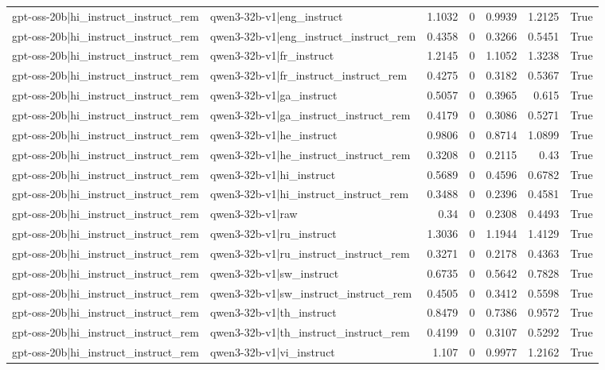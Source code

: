 \begin{table}
\begin{tabular}{l l r r r r l}
gpt-oss-20b|hi_instruct_instruct_rem & qwen3-32b-v1|eng_instruct & 1.1032 & 0 & 0.9939 & 1.2125 & True \\
gpt-oss-20b|hi_instruct_instruct_rem & qwen3-32b-v1|eng_instruct_instruct_rem & 0.4358 & 0 & 0.3266 & 0.5451 & True \\
gpt-oss-20b|hi_instruct_instruct_rem & qwen3-32b-v1|fr_instruct & 1.2145 & 0 & 1.1052 & 1.3238 & True \\
gpt-oss-20b|hi_instruct_instruct_rem & qwen3-32b-v1|fr_instruct_instruct_rem & 0.4275 & 0 & 0.3182 & 0.5367 & True \\
gpt-oss-20b|hi_instruct_instruct_rem & qwen3-32b-v1|ga_instruct & 0.5057 & 0 & 0.3965 & 0.615 & True \\
gpt-oss-20b|hi_instruct_instruct_rem & qwen3-32b-v1|ga_instruct_instruct_rem & 0.4179 & 0 & 0.3086 & 0.5271 & True \\
gpt-oss-20b|hi_instruct_instruct_rem & qwen3-32b-v1|he_instruct & 0.9806 & 0 & 0.8714 & 1.0899 & True \\
gpt-oss-20b|hi_instruct_instruct_rem & qwen3-32b-v1|he_instruct_instruct_rem & 0.3208 & 0 & 0.2115 & 0.43 & True \\
gpt-oss-20b|hi_instruct_instruct_rem & qwen3-32b-v1|hi_instruct & 0.5689 & 0 & 0.4596 & 0.6782 & True \\
gpt-oss-20b|hi_instruct_instruct_rem & qwen3-32b-v1|hi_instruct_instruct_rem & 0.3488 & 0 & 0.2396 & 0.4581 & True \\
gpt-oss-20b|hi_instruct_instruct_rem & qwen3-32b-v1|raw & 0.34 & 0 & 0.2308 & 0.4493 & True \\
gpt-oss-20b|hi_instruct_instruct_rem & qwen3-32b-v1|ru_instruct & 1.3036 & 0 & 1.1944 & 1.4129 & True \\
gpt-oss-20b|hi_instruct_instruct_rem & qwen3-32b-v1|ru_instruct_instruct_rem & 0.3271 & 0 & 0.2178 & 0.4363 & True \\
gpt-oss-20b|hi_instruct_instruct_rem & qwen3-32b-v1|sw_instruct & 0.6735 & 0 & 0.5642 & 0.7828 & True \\
gpt-oss-20b|hi_instruct_instruct_rem & qwen3-32b-v1|sw_instruct_instruct_rem & 0.4505 & 0 & 0.3412 & 0.5598 & True \\
gpt-oss-20b|hi_instruct_instruct_rem & qwen3-32b-v1|th_instruct & 0.8479 & 0 & 0.7386 & 0.9572 & True \\
gpt-oss-20b|hi_instruct_instruct_rem & qwen3-32b-v1|th_instruct_instruct_rem & 0.4199 & 0 & 0.3107 & 0.5292 & True \\
gpt-oss-20b|hi_instruct_instruct_rem & qwen3-32b-v1|vi_instruct & 1.107 & 0 & 0.9977 & 1.2162 & True \\

\end{tabular}
\end{table}

